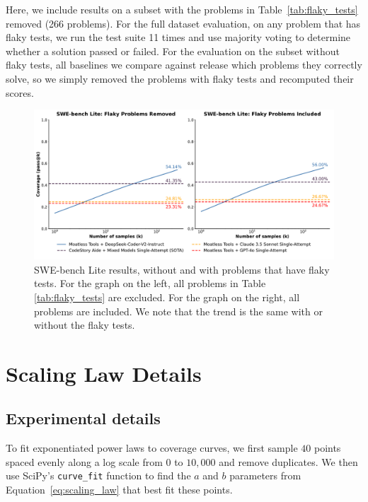 \documentclass[11pt]{article}
\begin{document}
Here, we include results on a subset with the problems in Table~\ref{tab:flaky_tests} removed (266 problems). For the full dataset evaluation, on any problem that has flaky tests, we run the test suite 11 times and use majority voting to determine whether a solution passed or failed. For the evaluation on the subset without flaky tests, all baselines we compare against release which problems they correctly solve, so we simply removed the problems with flaky tests and recomputed their scores.

\begin{figure}
    \centering
    \includegraphics[width=\textwidth]{figures/with_flaky.pdf}
    \caption{SWE-bench Lite results, without and with problems that have flaky tests. For the graph on the left, all problems in Table \ref{tab:flaky_tests} are excluded. For the graph on the right, all problems are included. We note that the trend is the same with or without the flaky tests.}
    \label{fig:expanded_predictions}
\end{figure}



\newpage{}
\newpage{}
\section{Scaling Law Details}

\subsection{Experimental details}

To fit exponentiated power laws to coverage curves, we first sample $40$ points spaced evenly along a log scale from $0$ to $10,000$ and remove duplicates. We then use SciPy's \cite{2020SciPy-NMeth} \verb|curve_fit| function to find the $a$ and $b$ parameters from Equation~\ref{eq:scaling_law} that best fit these points.
\end{document}
